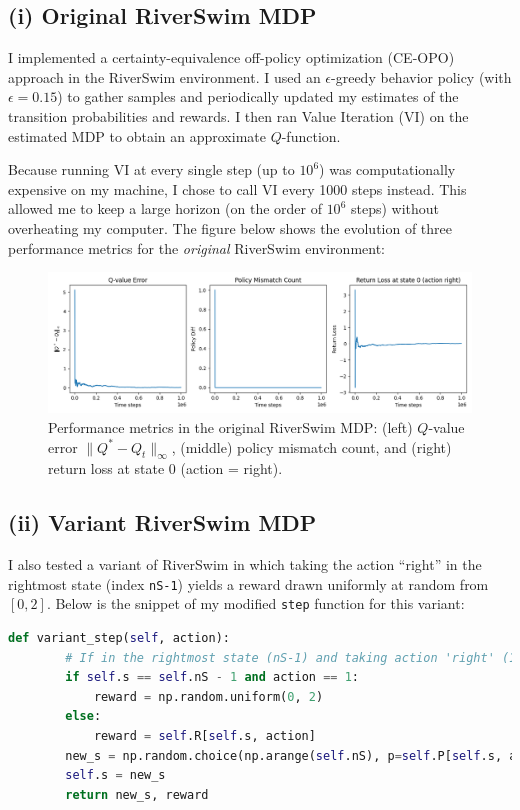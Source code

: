 \subsection*{(i) Original RiverSwim MDP}
I implemented a certainty-equivalence off-policy optimization (CE-OPO) approach in the RiverSwim environment. 
I used an $\epsilon$-greedy behavior policy (with $\epsilon=0.15$) to gather samples and periodically updated 
my estimates of the transition probabilities and rewards. I then ran Value Iteration (VI) on the estimated MDP 
to obtain an approximate $Q$-function. 

Because running VI at every single step (up to $10^6$) was computationally expensive on my machine, I chose to 
call VI every 1000 steps instead. This allowed me to keep a large horizon (on the order of $10^6$ steps) without 
overheating my computer. The figure below shows the evolution of three performance metrics for the \emph{original} 
RiverSwim environment:

\begin{figure}[H]
    \centering
    \includegraphics[width=1\textwidth]{Code/RiverSwim_CE-OPO.png}
    \caption{Performance metrics in the original RiverSwim MDP: (left) $Q$-value error $\|Q^* - Q_t\|_\infty$, 
    (middle) policy mismatch count, and (right) return loss at state 0 (action = right).}
    \label{fig:original}
\end{figure}

\subsection*{(ii) Variant RiverSwim MDP}
I also tested a variant of RiverSwim in which taking the action ``right'' in the rightmost state 
(index \texttt{nS-1}) yields a reward drawn uniformly at random from $[0,2]$. Below is the snippet of my modified 
\texttt{step} function for this variant:

\begin{lstlisting}[language=Python, caption={Definition of the policy network.}, basicstyle=\ttfamily\small]
    def variant_step(self, action):
        # If in the rightmost state (nS-1) and taking action 'right' (1):
        if self.s == self.nS - 1 and action == 1:
            reward = np.random.uniform(0, 2)
        else:
            reward = self.R[self.s, action]
        new_s = np.random.choice(np.arange(self.nS), p=self.P[self.s, action])
        self.s = new_s
        return new_s, reward
\end{lstlisting}

